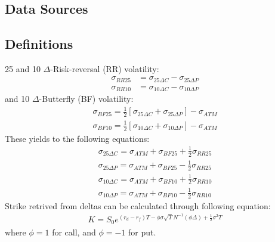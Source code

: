 \appendix
\chapter{}
\section{Data Sources}
\newpage
\section{Definitions}
25 and 10 $\Delta$-Risk-reversal (RR) volatility:
\begin{align}
\sigma_{RR25}&=\sigma_{25\Delta C}-\sigma_{25\Delta P}\\
\sigma_{RR10}&=\sigma_{10\Delta C}-\sigma_{10\Delta P}
\end{align}
 and 10 $\Delta$-Butterfly (BF) volatility:
\begin{align}
\sigma_{BF25}=\frac{1}{2}\left[\sigma_{25\Delta C}+\sigma_{25\Delta P}\right]-\sigma_{ATM}\\
\sigma_{BF10}=\frac{1}{2}\left[\sigma_{10\Delta C}+\sigma_{10\Delta P}\right]-\sigma_{ATM}
\end{align}
\newline
These yields to the following equations:
\begin{align}
\sigma_{25\Delta C}=\sigma_{ATM}+\sigma_{BF25}+\frac{1}{2}\sigma_{RR25}\\
\sigma_{25\Delta P}=\sigma_{ATM}+\sigma_{BF25}-\frac{1}{2}\sigma_{RR25}\\
\sigma_{10\Delta C}=\sigma_{ATM}+\sigma_{BF10}+\frac{1}{2}\sigma_{RR10}\\
\sigma_{10\Delta P}=\sigma_{ATM}+\sigma_{BF10}-\frac{1}{2}\sigma_{RR10}
\end{align}
\newline
Strike retrived from deltas can be calculated through following equation:
\begin{align}
K=S_0e^{(r_d-r_f)T-\phi \sigma \sqrt{T} N^{-1}(\phi \Delta)+\frac{1}{2}\sigma^2T}
\end{align}
where $\phi=1$ for call, and $\phi=-1$ for put.
